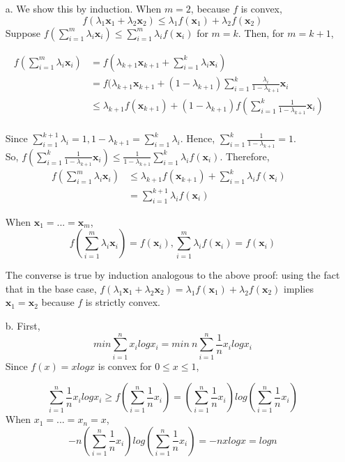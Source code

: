 \documentclass[11pt]{article}
\theoremstyle{remark}
\newcommand{\bx}{\mathbf{x}}
\begin{document}
\color{blue}
\begin{itemize}
\item[a.]
We show this by induction. When $m=2$, because $f$ is convex,
$$f(\lambda_1\bx_1+\lambda_2\bx_2) \leq \lambda_1 f(\bx_1)+\lambda_2f(\bx_2)$$
Suppose $f\left(\sum_{i=1}^m\lambda_i\bx_i\right)
            \leq \sum_{i=1}^m\lambda_if(\bx_i)$ for $m=k$. Then, for $m=k+1$,

\begin{align*}
f\left(\sum_{i=1}^m\lambda_i\bx_i\right) &= f(\lambda_{k+1}\bx_{k+1} + \sum_{i=1}^k \lambda_i\bx_i) &\\
&= f(\lambda_{k+1}\bx_{k+1} + (1-\lambda_{k+1})\sum_{i=1}^k \frac{\lambda_i}{1-\lambda_{k+1}}\bx_i &\\
&\leq  \lambda_{k+1} f(\bx_{k+1}) + (1-\lambda_{k+1})f(\sum_{i=1}^k \frac{1}{1-\lambda_{k+1}}\bx_i) &\\
\end{align*}

Since $\sum_{i=1}^{k+1}\lambda_i=1, 1-\lambda_{k+1} = \sum_{i=1}^k \lambda_i$. Hence, $\sum_{i=1}^k \frac{1}{1-\lambda_{k+1}}= 1$. \\
So, $f(\sum_{i=1}^k \frac{1}{1-\lambda_{k+1}}\bx_i) \leq \frac{1}{1-\lambda_{k+1}} \sum_{i=1}^k \lambda_i f(\bx_i)$.
Therefore,
\begin{align*}
f(\sum_{i=1}^m\lambda_i\bx_i) &\leq  \lambda_{k+1} f(\bx_{k+1}) + \sum_{i=1}^k \lambda_i f(\bx_i) &\\
&= \sum_{i=1}^{k+1} \lambda_i f(\bx_i)
\end{align*}

When $\bx_1=...=\bx_m$, \\ 
$$f\left(\sum_{i=1}^m\lambda_i\bx_i\right)=f(\bx_i),\sum_{i=1}^m\lambda_if(\bx_i)=f(\bx_i)$$

The converse is true by induction analogous to the above proof: using the fact that in the base case, $f(\lambda_1\bx_1+\lambda_2\bx_2)=\lambda_1f(\bx_1)+\lambda_2f(\bx_2)$ implies $\bx_1=\bx_2$ because $f$ is strictly convex.

\item[b.]
First, 
$$min \sum_{i=1}^nx_i logx_i=min \ n\sum_{i=1}^n \frac{1}{n}x_i logx_i$$
Since $f(x)=xlogx$ is convex for $0 \leq x \leq 1$,

$$\sum_{i=1}^n \frac{1}{n}x_i logx_i \geq f(\sum_{i=1}^n \frac{1}{n}x_i) = (\sum_{i=1}^n \frac{1}{n}x_i)log(\sum_{i=1}^n \frac{1}{n}x_i)$$
When $x_1=...=x_n=x$,
$$-n(\sum_{i=1}^n \frac{1}{n}x_i)log(\sum_{i=1}^n \frac{1}{n}x_i) = -nxlogx=logn$$


\end{itemize}
\end{document}
